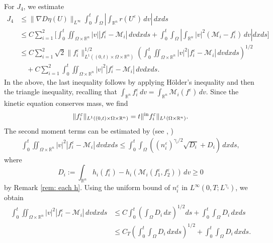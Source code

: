 \documentclass[10pt,reqno]{amsart}
\numberwithin{equation}{section}
\newcommand{\R}{\mathbb R}
\newcommand{\intr}{\int_{\R^n}}
\newcommand{\calM}{\mathcal M}
\newcommand{\ve}{\varepsilon}
\begin{document}
For $J_4$, we estimate
    \begin{equation} \label{eq: J4}
    \begin{split}
    J_4 &\le \|\nabla D\eta(U)\|_{L^\infty} \int_0^t \int_\Omega \left|\intr r(U^\ve)\,dv\right|\,dxds \\
    &\le C\sum_{i=1}^2 \Bigg[ \int_0^t \iint_{\Omega \times \R^n} |v| |f_i^\ve - \calM_i|\,dvdx ds  + \int_0^t \int_\Omega \left|\intr |v|^2 (\calM_i - f_i^\ve)\,dv\right|dx ds\Bigg] \\
    &\le C \sum_{i=1}^2  \sqrt{2}\|f_i^\ve\|_{L^1((0,t)\times\Omega \times \R^n)}^{1/2} \left(\int_0^t \iint_{\Omega \times \R^n} |v|^2 |f_i^\ve - \calM_i|\,dv dx ds\right)^{1/2}  \\
    &\quad + C \sum_{i=1}^2 \int_0^t \iint_{\Omega \times \R^n} |v|^2 |f_i^\ve - \calM_i|\,dvdxds.
    \end{split}
    \end{equation}
    In the above, the last inequality follows by applying H\"older's inequality and then the triangle inequality, recalling that $\intr f_i^\ve\,dv = \intr \calM_i(f^\ve)\,dv$. Since the kinetic equation conserves mass, we find 
    \[
    \|f_i^\ve\|_{L^1((0,t)\times\Omega \times \R^n)} = t\|{}^{\rm in}f_i^\ve\|_{L^1(\Omega \times \R^n)}. 
    \]
The second moment terms can be estimated by (see \cite[Proposition 4.1]{BV05}, \cite[Lemma 1.4]{KS24})
    \begin{align*}
    \int_0^t \iint_{\Omega \times \R^n} |v|^2 |f_i^\ve - \calM_i|\,dvdxds \le \int_0^t \int_\Omega  ((n_i^{\ve})^{\gamma_i/2 } \sqrt{D_i} + D_i) \,dx ds, 
    \end{align*}
    where 
    \[
    D_i := \intr h_i(f_i^\ve) - h_i(\calM_i(f_1^\ve,f_2^\ve))\,dv \ge 0
    \]
     by Remark \ref{rem: each h}.     Using the uniform bound of $n_i^\ve$ in $L^\infty(0,T;L^{\gamma_i})$, we obtain
    \begin{equation} \label{eq: secmoments}
    \begin{split}
        \int_0^t \iint_{\Omega \times \R^n} |v|^2 |f_i^\ve - \calM_i|\,dvdxds &\le C \int_0^t \left(\int_\Omega D_i\,dx\right)^{1/2}ds + \int_0^t \int_\Omega D_i\,dxds \\
        &\le C_T \left(\int_0^t \int_\Omega D_i\,dxds \right)^{1/2} + \int_0^t \int_\Omega D_i\,dxds.
    \end{split}
    \end{equation}
    
\end{document}
